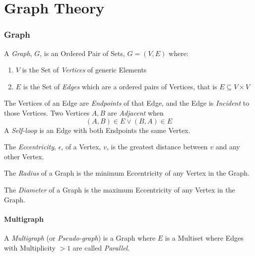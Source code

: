 \part{Graph Theory}

\section{Graph} \label{sec:graph}

A \emph{Graph}, $G$, is an Ordered Pair of Sets, $G = (V,E)$ where:
\begin{enumerate}
\item $V$ is the Set of \emph{Vertices} of generic Elements
\item $E$ is the Set of \emph{Edges} which are a ordered pairs of
  Vertices, that is $E \subseteq V \times V$
\end{enumerate}
The Vertices of an Edge are \emph{Endpoints} of that Edge, and the
Edge is \emph{Incident} to those Vertices. Two Vertices $A,B$ are
\emph{Adjacent} when
\[
    (A,B) \in E \vee (B,A) \in E
\]
A \emph{Self-loop} is an Edge with both Endpoints the same Vertex.

The \emph{Eccentricity}, $\epsilon$, of a Vertex, $v$, is the greatest
distance between $v$ and any other Vertex.

The \emph{Radius} of a Graph is the minimum Eccentricity of any
Vertex in the Graph.

The \emph{Diameter} of a Graph is the maximum Eccentricity of any
Vertex in the Graph.



\subsection{Multigraph} \label{sec:multigraph}

A \emph{Multigraph} (or \emph{Pseudo-graph}) is a Graph where $E$ is a
Multiset where Edges with Multiplicity $>1$ are called
\emph{Parallel}.



